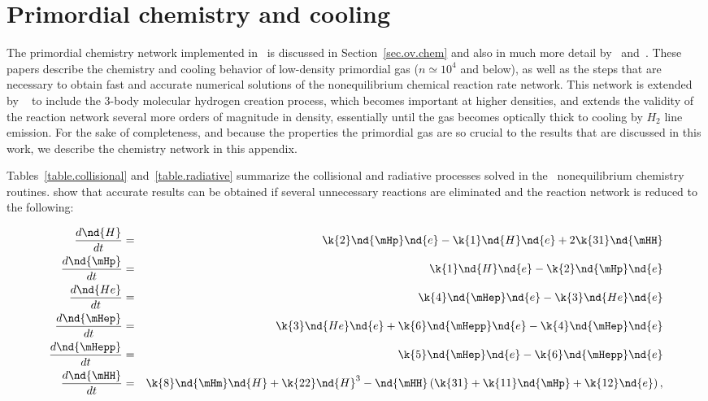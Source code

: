 
\section{Primordial chemistry and cooling}\label{app:chemistry}


The primordial chemistry network implemented in \enzo\ is discussed in 
Section~\ref{sec.ov.chem} and also in
much more detail by~\citet{abel97} and~\citet{anninos97}.  
These papers describe the chemistry and cooling behavior of low-density primordial gas
($n \simeq 10^4$ and below), as well as
the steps that are necessary to obtain fast and accurate numerical solutions of the 
nonequilibrium chemical reaction rate network.  This network is extended by
~\citet{ABN02} to include the 3-body molecular hydrogen creation process, 
which becomes important at higher densities, and extends the validity of the reaction
network several more orders of magnitude in density, essentially until the gas becomes
optically thick to cooling by $H_2$ line emission. 
For the sake of completeness, and because the properties the primordial gas are so 
crucial to the results that are discussed in this work, we describe the chemistry 
network in this appendix.

Tables~\ref{table.collisional} and~\ref{table.radiative} summarize the collisional
and radiative processes solved in the \enzo\ nonequilibrium chemistry routines.  
\citet{abel97} show that accurate results can be obtained if several unnecessary
reactions are eliminated and the reaction network is reduced to the following:


\begin{eqnarray}
\frac{d \nd{H} }{dt}    &=& \k{2} \nd{\mHp} \nd{e} - \k{1} \nd{H} \nd{e} + 2 \k{31} \nd{\mHH}  \\
\frac{d\nd{\mHp}}{dt}  &=& \k{1} \nd{H}   \nd{e} - \k{2} \nd{\mHp}  \nd{e}      \\
\frac{d\nd{He} }{dt}  &=& \k{4} \nd{\mHep}\nd{e} - \k{3} \nd{He}   \nd{e}       \\
\frac{d\nd{\mHep}}{dt} &=& \k{3} \nd{He} \nd{e} + \k{6} \nd{\mHepp}\nd{e} -
                       \k{4} \nd{\mHep}\nd{e}                           \\
\frac{d\nd{\mHepp}}{dt}&=& \k{5} \nd{\mHep}\nd{e} - \k{6} \nd{\mHepp} \nd{e}    \\
\frac{d\nd{\mHH} }{dt}  &=& \k{8} \nd{\mHm} \nd{H} + \k{22} \nd{H}^3 - \nd{\mHH}   \left( 
        \k{31} + \k{11} \nd{\mHp} + \k{12} \nd{e} \right), 
\end{eqnarray}

